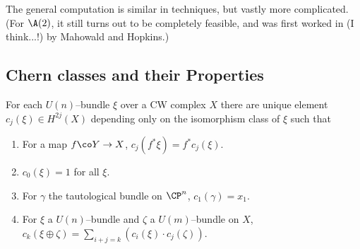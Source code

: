 The general computation is similar in techniques, but vastly more complicated.  (For $\A(2)$, it still turns out to be completely feasible, and was first worked in (I think...!) by Mahowald and Hopkins.)




\begin{subappendices}

\section{Chern classes and their Properties}

\begin{theorem}
For each $U(n)$--bundle $\xi$ over a CW complex $X$ there are unique element $c_j(\xi) \in H^{2j}(X)$ depending only on the isomorphism class of $\xi$ such that
\begin{enumerate}
    \item For a map $f\co Y \to X$, $c_j(f^* \xi) = f^* c_j(\xi)$.
    \item $c_0(\xi) = 1$ for all $\xi$.
    \item For $\gamma$ the tautological bundle on $\CP^n$, $c_1(\gamma) = x_1$.
    \item For $\xi$ a $U(n)$--bundle and $\zeta$ a $U(m)$--bundle on $X$, $c_k(\xi \oplus \zeta) = \sum_{i+j=k} (c_i(\xi) \cdot c_j(\zeta))$.
\end{enumerate}
\end{theorem}


\end{subappendices}
